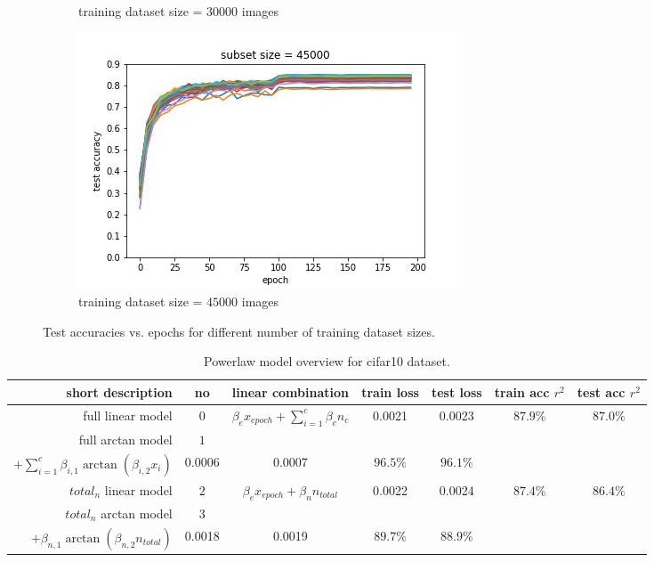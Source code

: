 \documentclass{article} %
\begin{document}
\begin{figure}
\begin{subfigure}{.5\textwidth}
        \caption{training dataset size = $30000$ images}
        \label{fig:subsetsize30000}
    \end{subfigure}%
    \begin{subfigure}{.5\textwidth}
        \centering
        \includegraphics[width=.8\linewidth]{cifar10/test_acc_vs_epoch_subset_size_45000.jpg}
        \caption{training dataset size = $45000$ images}
        \label{fig:subsetsize45000}
    \end{subfigure}

    \caption{Test accuracies vs. epochs for different number of training dataset sizes.}
    \label{fig:accuracy_vs_epoch_by_subset_size}
\end{figure}


\begin{table}[h!]
    \centering
    \begin{tabular}{|r|c|c|c|c|c|c|}
        \hline
        short description   & no  & linear combination                               & train loss & test loss & train acc $r^2$ & test acc $r^2$ \\
        \hline
        full linear model          & $0$ & $\beta_e x_{epoch} + \sum_{i = 1}^c \beta_c n_c$ & 0.0021    & 0.0023   & $87.9\%$        & $87.0\%$       \\
        \hline
        full arctan model & $1$& \makecell{$\beta_{e, 1} \arctan{(\beta_{e, 2} x_{epoch})}$ \\  $+ \sum_{i = 1}^c \beta_{i, 1} \arctan{(\beta_{i, 2} x_{i})}$}& 0.0006 & 0.0007 & $96.5\%$ & $96.1\%$ \\
        \hline
        $total_n$ linear model & $2$ & $\beta_e x_{epoch} + \beta_n n_{total}$          & 0.0022    & 0.0024   & $87.4\%$        & $86.4\%$       \\
        \hline
        $total_n$ arctan model &$3$&\makecell{ $\beta_{e, 1} \arctan{(\beta_{e, 2} x_{epoch})}$ \\ $+ \beta_{n, 1} \arctan{(\beta_{n, 2} n_{total})}$} & 0.0018 & 0.0019 & $89.7\%$ & $88.9\%$ \\
        \hline
    \end{tabular}
    \caption{Powerlaw model overview for cifar10 dataset.}
    \label{table:cifar_model_overview}
\end{table}
\end{document}

